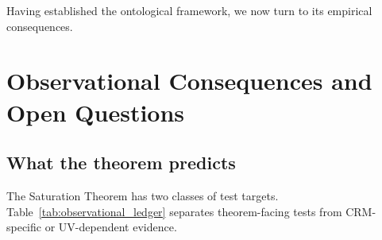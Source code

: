 \documentclass[aps,prd,twocolumn,superscriptaddress,nofootinbib]{revtex4-2}
\begin{document}
Having established the ontological framework, we now turn to its empirical consequences.

\section{Observational Consequences and Open Questions}
\label{sec:observational}

\subsection{What the theorem predicts}

The Saturation Theorem has two classes of test targets. Table~\ref{tab:observational_ledger} separates theorem-facing tests from CRM-specific or UV-dependent evidence.
\end{document}
